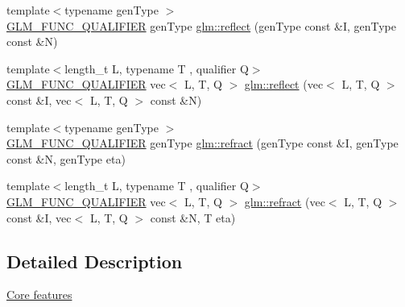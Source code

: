 \begin{DoxyCompactItemize}
\item 
{\footnotesize template$<$typename gen\+Type $>$ }\\\hyperlink{setup_8hpp_a33fdea6f91c5f834105f7415e2a64407}{G\+L\+M\+\_\+\+F\+U\+N\+C\+\_\+\+Q\+U\+A\+L\+I\+F\+I\+ER} gen\+Type \hyperlink{namespaceglm_acdc166d33265ec31212f230e9db8db36}{glm\+::reflect} (gen\+Type const \&I, gen\+Type const \&N)
\item 
{\footnotesize template$<$length\+\_\+t L, typename T , qualifier Q$>$ }\\\hyperlink{setup_8hpp_a33fdea6f91c5f834105f7415e2a64407}{G\+L\+M\+\_\+\+F\+U\+N\+C\+\_\+\+Q\+U\+A\+L\+I\+F\+I\+ER} vec$<$ L, T, Q $>$ \hyperlink{group__core__func__geometric_ga5631dd1d5618de5450b1ea3cf3e94905}{glm\+::reflect} (vec$<$ L, T, Q $>$ const \&I, vec$<$ L, T, Q $>$ const \&N)
\item 
{\footnotesize template$<$typename gen\+Type $>$ }\\\hyperlink{setup_8hpp_a33fdea6f91c5f834105f7415e2a64407}{G\+L\+M\+\_\+\+F\+U\+N\+C\+\_\+\+Q\+U\+A\+L\+I\+F\+I\+ER} gen\+Type \hyperlink{namespaceglm_ae4b0245b42a72957d3026ac365731821}{glm\+::refract} (gen\+Type const \&I, gen\+Type const \&N, gen\+Type eta)
\item 
{\footnotesize template$<$length\+\_\+t L, typename T , qualifier Q$>$ }\\\hyperlink{setup_8hpp_a33fdea6f91c5f834105f7415e2a64407}{G\+L\+M\+\_\+\+F\+U\+N\+C\+\_\+\+Q\+U\+A\+L\+I\+F\+I\+ER} vec$<$ L, T, Q $>$ \hyperlink{group__core__func__geometric_ga01da3dff9e2ef6b9d4915c3047e22b74}{glm\+::refract} (vec$<$ L, T, Q $>$ const \&I, vec$<$ L, T, Q $>$ const \&N, T eta)
\end{DoxyCompactItemize}


\subsection{Detailed Description}
\hyperlink{group__core}{Core features} 
